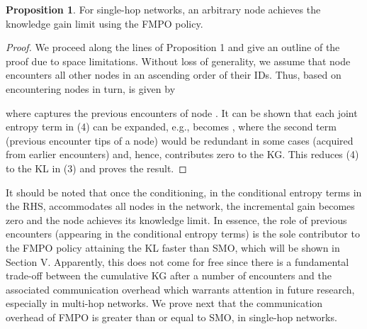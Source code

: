 \documentclass[conference]{IEEEtran}
\theoremstyle{definition}
\newtheorem{prop}{Proposition}
\begin{document}
\begin{prop}
For single-hop networks, an arbitrary node achieves the knowledge gain limit using the FMPO policy.
\end{prop}
\vspace{-0.2 cm}
\begin{proof}
We proceed along the lines of Proposition 1 and give an outline of the proof due to space limitations. Without loss of generality, we assume that node  encounters all other nodes in an ascending order of their IDs. Thus,  based on encountering nodes  in turn, is given by
 


\noindent where  captures the previous encounters of node . It can 
be shown that each joint entropy term in (4) can be expanded, 
e.g.,  becomes , where 
the second term (previous encounter tips of a node) would be redundant in some cases (acquired from earlier encounters) and, hence, contributes zero to the KG. This reduces (4) to the KL in (3) and proves the result.
\end{proof}
It should be noted that once the conditioning, in the conditional entropy terms in the RHS, accommodates all nodes in the network, the incremental gain becomes zero and the node achieves its knowledge limit. In essence, the role of previous encounters (appearing in the conditional entropy terms) is the sole contributor to the FMPO policy attaining the KL faster than SMO, which will be shown in Section V. Apparently, this does not come for free since there is a fundamental trade-off between the cumulative KG after a number of encounters and the associated communication overhead which warrants attention in future research, especially in multi-hop networks. We prove next that the communication overhead of FMPO is greater than or equal to SMO, in single-hop networks.
\end{document}
